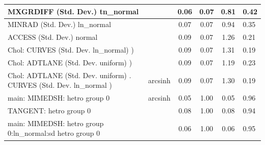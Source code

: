 \begin{table}
\begin{center}
\begin{tabular}{|l|l|c|c|c|l|}
			\hline
			MXGRDIFF (Std. Dev.) tn_normal &  & 0.06 & 0.07 & 0.81 & 0.42 \\
			\hline
			MINRAD (Std. Dev.) ln_normal &  & 0.07 & 0.07 & 0.94 & 0.35 \\
			\hline
			ACCESS (Std. Dev.) normal &  & 0.09 & 0.07 & 1.26 & 0.21 \\
			\hline
			 Chol: CURVES (Std. Dev. ln_normal) ) &  & 0.09 & 0.07 & 1.31 & 0.19 \\
			\hline
			 Chol: ADTLANE (Std. Dev. uniform) ) &  & 0.09 & 0.07 & 1.19 & 0.23 \\
			\hline
			 Chol: ADTLANE (Std. Dev. uniform) . CURVES (Std. Dev.   ln_normal ) & arcsinh & 0.09 & 0.07 & 1.30 & 0.19 \\
			\hline
			main: MIMEDSH: hetro group 0 & arcsinh & 0.05 & 1.00 & 0.05 & 0.96 \\
			\hline
			TANGENT: hetro group 0 &  & 0.08 & 1.00 & 0.08 & 0.94 \\
			\hline
			main: MIMEDSH: hetro group 0:ln_normal:sd  hetro group 0 &  & 0.06 & 1.00 & 0.06 & 0.95 \\
			\hline
		\end{tabular}
	\end{center}
\end{table}